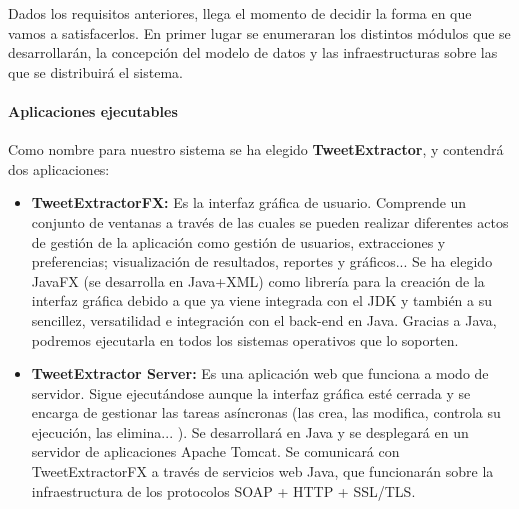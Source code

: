 Dados los requisitos anteriores, llega el momento de decidir la forma en que vamos a satisfacerlos. En primer lugar se enumeraran los distintos módulos que se desarrollarán, la concepción del modelo de datos  y las infraestructuras sobre las que se distribuirá el sistema.

\paragraph{Aplicaciones ejecutables}
Como nombre para nuestro sistema se ha elegido \textbf{TweetExtractor}, y contendrá dos aplicaciones:
\begin{itemize}
	\item \textbf{TweetExtractorFX:} Es la interfaz gráfica de usuario. Comprende un conjunto de ventanas a través de las cuales se pueden realizar diferentes actos de gestión de la aplicación como gestión de usuarios, extracciones y preferencias; visualización de resultados, reportes y gráficos...
	Se ha elegido JavaFX (se desarrolla en Java+XML) como librería para la creación de la interfaz gráfica debido a que ya viene integrada con el JDK y también a su sencillez, versatilidad e integración con el back-end en Java. Gracias a Java, podremos ejecutarla en todos los sistemas operativos que lo soporten.
	\item \textbf{TweetExtractor Server:} Es una aplicación web que funciona a modo de servidor. Sigue ejecutándose aunque la interfaz gráfica esté cerrada y se encarga de gestionar las tareas asíncronas (las crea, las modifica, controla su ejecución, las elimina... ). Se desarrollará en Java y se desplegará en un servidor de aplicaciones Apache Tomcat. Se comunicará con TweetExtractorFX a través de servicios web Java, que funcionarán sobre la infraestructura de los protocolos SOAP + HTTP + SSL/TLS. 
\end{itemize}
